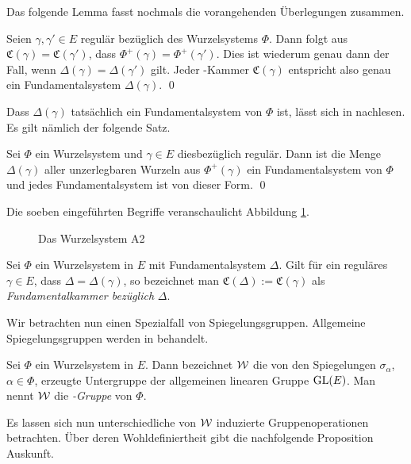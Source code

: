 Das folgende Lemma fasst nochmals die vorangehenden Überlegungen zusammen.

\begin{lem}
  Seien $\gamma, \gamma' \in E$ regulär bezüglich des Wurzelsystems $\Phi$.
  Dann folgt aus $\mathfrak{C}(\gamma) = \mathfrak{C}(\gamma')$, dass $\Phi^+(\gamma) = \Phi^+(\gamma')$. 
  Dies ist wiederum genau dann der Fall, wenn $\Delta(\gamma) = \Delta(\gamma')$ gilt.
  Jeder \weyl\hyp{}Kammer $\mathfrak{C}(\gamma)$ entspricht also genau ein Fundamentalsystem $\Delta(\gamma)$. \qed
\end{lem}

Dass $\Delta(\gamma)$ tatsächlich ein Fundamentalsystem von $\Phi$ ist, lässt sich in \cite[S.48]{humphreys1972introduction} nachlesen.
Es gilt nämlich der folgende Satz.

\begin{thm}
  Sei $\Phi$ ein Wurzelsystem und $\gamma \in E$ diesbezüglich regulär.
  Dann ist die Menge $\Delta(\gamma)$ aller unzerlegbaren Wurzeln aus $\Phi^+(\gamma)$ ein Fundamentalsystem von $\Phi$ und jedes Fundamentalsystem ist von dieser Form. \qed
\end{thm}

Die soeben eingeführten Begriffe veranschaulicht Abbildung \ref{fig:fundamentalWeylChamber}.

\begin{figure}
  \caption{Das Wurzelsystem A2}
  \label{fig:fundamentalWeylChamber}
\end{figure}

\begin{defn}
  Sei $\Phi$ ein Wurzelsystem in $E$ mit Fundamentalsystem $\Delta$.
  Gilt für ein reguläres $\gamma \in E$, dass $\Delta = \Delta(\gamma)$, so bezeichnet man $\mathfrak{C}(\Delta) := \mathfrak{C}(\gamma)$ als \emph{Fundamentalkammer bezüglich} $\Delta$.
\end{defn}

Wir betrachten nun einen Spezialfall von Spiegelungsgruppen. Allgemeine Spiegelungsgruppen werden in \cite{humphreys1992reflection} behandelt.

\begin{defn}
  \label{def:weylgroup}
  Sei $\Phi$ ein Wurzelsystem in $E$. 
  Dann bezeichnet $\mathcal{W}$ die von den Spiegelungen $\sigma_\alpha$, $\alpha \in \Phi$, erzeugte Untergruppe der allgemeinen linearen Gruppe $\operatorname{GL}(E)$. 
  Man nennt $\mathcal{W}$ die \emph{\weyl\hyp{}Gruppe} von $\Phi$.
\end{defn}

Es lassen sich nun unterschiedliche von $\mathcal{W}$ induzierte Gruppenoperationen betrachten. Über deren Wohldefiniertheit gibt die nachfolgende Proposition Auskunft. 


